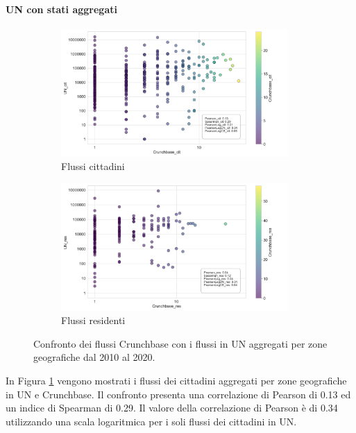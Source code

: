 \paragraph{UN con stati aggregati}
\label{UN_aggregated}
\begin{figure}[tb]
    \centering
    \begin{subfigure}{\textwidth}
        \centering
        \includegraphics[width=0.95\textwidth]{images/flows/aggregated/UN_cit_True.png}
        \caption{Flussi cittadini}
        \label{fig:uncrunchtrue_cit}
    \end{subfigure}
    \begin{subfigure}{\textwidth}
        \includegraphics[width=0.95\textwidth]{images/flows/aggregated/UN_res_True.png}
        \caption{Flussi residenti}
        \label{fig:uncrunchtrue_res}
    \end{subfigure}
    \caption{Confronto dei flussi Crunchbase con i flussi in UN aggregati per zone geografiche dal 2010 al 2020.}
    \label{fig:uncrunchtrue}
\end{figure}
In Figura \ref{fig:uncrunchtrue_cit} vengono mostrati i flussi dei cittadini aggregati per zone geografiche in UN e Crunchbase. Il confronto presenta una correlazione di Pearson di 0.13 ed un indice di Spearman di 0.29. Il valore della correlazione di Pearson è di 0.34 utilizzando una scala logaritmica per i soli flussi dei cittadini in UN. 
